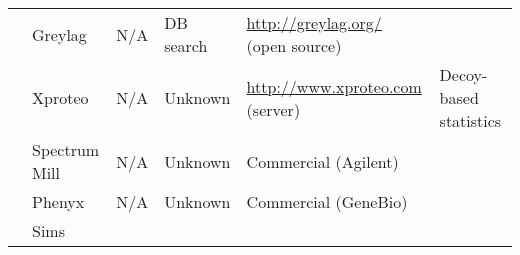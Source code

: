 \documentclass[landscape]{article}
\begin{document}
\begin{tabular}{cp{1.5in}p{1.5in}lp{2in}p{3in}}
& Greylag & N/A & DB search &
\url{http://greylag.org/} (open source) \\

& Xproteo & N/A & Unknown &
\url{http://www.xproteo.com} (server) & 
Decoy-based statistics \\

& Spectrum Mill & N/A & Unknown &
Commercial (Agilent) \\

& Phenyx & N/A & Unknown &
Commercial (GeneBio) \\

& Sims \\


\end{tabular}

\clearpage


\end{document}
